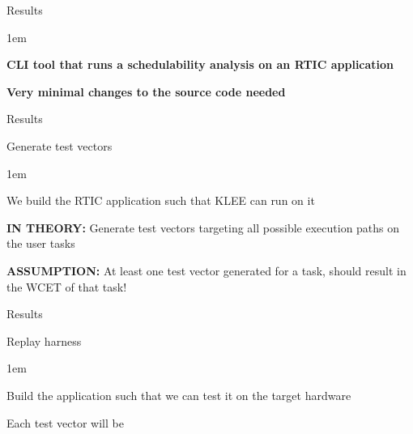 \begin{frame}{Results}
    \begin{itemize-size}{1em}
        \item \textbf{CLI tool that runs a schedulability analysis on an RTIC application}
        \item \textbf{Very minimal changes to the source code needed}
    \end{itemize-size}          
\end{frame}

\begin{frame}{Results}
    \begin{block}{Generate test vectors}
        \begin{itemize-size}{1em}
            \item We build the RTIC application such that KLEE can run on it
            \item \textbf{IN THEORY:} Generate test vectors targeting all possible
            execution paths on the user tasks
            \item \textbf{ASSUMPTION:} At least one test vector generated for a task, should
            result in the WCET of that task!
        \end{itemize-size}  
    \end{block}
\end{frame}

\begin{frame}{Results}
    \begin{block}{Replay harness}
        \begin{itemize-size}{1em}
            \item Build the application such that we can test it on the target hardware
            \item Each test vector will be 
        \end{itemize-size}  
    \end{block}
\end{frame}
